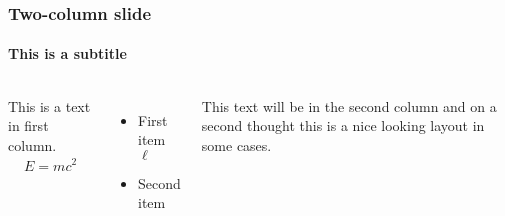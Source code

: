 \documentclass[11pt]{../formats/RU}
\begin{document}
\begin{frame}
\frametitle{Two-column slide}
\framesubtitle{This is a subtitle}

\begin{columns}

This is a text in first column.
\begin{align*}
  E=mc^2
\end{align*}
\begin{itemize}
\item First item $\ell$
\item Second item
\end{itemize}

This text will be in the second column
and on a second thought this is a nice looking
layout in some cases.
\end{columns}
\end{frame}
\end{document}
